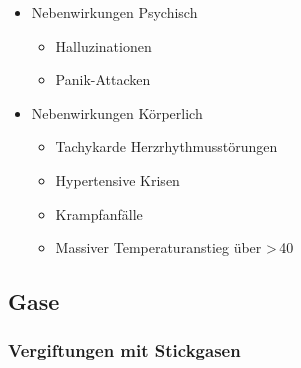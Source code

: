 {{}{
\begin{itemize}
  \item Nebenwirkungen Psychisch
  \begin{itemize}
    \item Halluzinationen
    \item Panik-Attacken
  \end{itemize}
  \item Nebenwirkungen Körperlich
  \begin{itemize}
    \item Tachykarde Herzrhythmusstörungen
    \item Hypertensive Krisen
    \item Krampfanfälle
    \item Massiver Temperaturanstieg über
    {\textgreater}\,40\DegC*
  \end{itemize}
\end{itemize}
}{}{}{}



\cite{Supady2009}








\clearpage %
\subsection{Gase}

\subsubsection{Vergiftungen mit Stickgasen}

}
